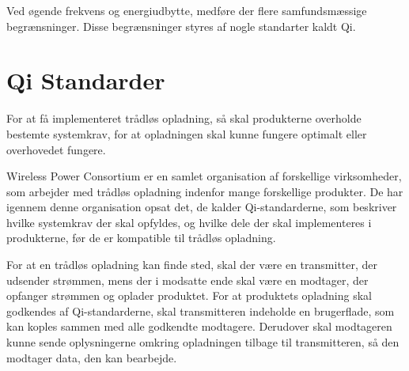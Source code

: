 Ved øgende frekvens og energiudbytte, medføre der flere samfundsmæssige begrænsninger. Disse begrænsninger styres af nogle standarter kaldt Qi.

\section{Qi Standarder}
For at få implementeret trådløs opladning, så skal produkterne overholde bestemte systemkrav, for at opladningen skal kunne fungere optimalt eller overhovedet fungere.

Wireless Power Consortium er en samlet organisation af forskellige virksomheder, som arbejder med trådløs opladning indenfor mange forskellige produkter. De har igennem denne organisation opsat det, de kalder Qi-standarderne, som beskriver hvilke systemkrav der skal opfyldes, og hvilke dele der skal implementeres i produkterne, før de er kompatible til trådløs opladning.

For at en trådløs opladning kan finde sted, skal der være en transmitter, der udsender strømmen, mens der i modsatte ende skal være en modtager, der opfanger strømmen og oplader produktet. For at produktets opladning skal godkendes af Qi-standarderne, skal transmitteren indeholde en brugerflade, som kan koples sammen med alle godkendte modtagere. Derudover skal modtageren kunne sende oplysningerne omkring opladningen tilbage til transmitteren, så den modtager data, den kan bearbejde. \cite{qi}
\newpage